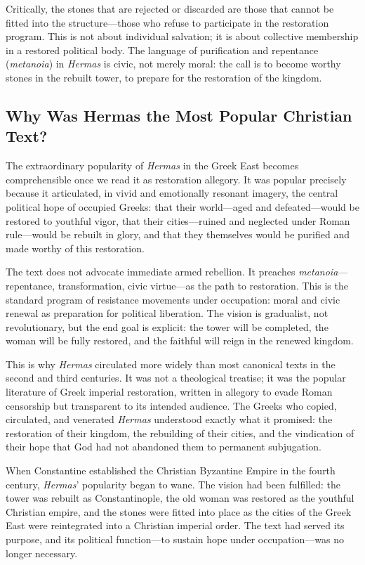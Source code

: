 Critically, the stones that are rejected or discarded are those that cannot be fitted into the structure---those who refuse to participate in the restoration program.
This is not about individual salvation; it is about collective membership in a restored political body.
The language of purification and repentance (\emph{metanoia}) in \emph{Hermas} is civic, not merely moral: the call is to become worthy stones in the rebuilt tower, to prepare for the restoration of the kingdom.

\subsection{Why Was Hermas the Most Popular Christian Text?}

The extraordinary popularity of \emph{Hermas} in the Greek East becomes comprehensible once we read it as restoration allegory.
It was popular precisely because it articulated, in vivid and emotionally resonant imagery, the central political hope of occupied Greeks: that their world---aged and defeated---would be restored to youthful vigor, that their cities---ruined and neglected under Roman rule---would be rebuilt in glory, and that they themselves would be purified and made worthy of this restoration.

The text does not advocate immediate armed rebellion.
It preaches \emph{metanoia}---repentance, transformation, civic virtue---as the path to restoration.
This is the standard program of resistance movements under occupation: moral and civic renewal as preparation for political liberation.
The vision is gradualist, not revolutionary, but the end goal is explicit: the tower will be completed, the woman will be fully restored, and the faithful will reign in the renewed kingdom.

This is why \emph{Hermas} circulated more widely than most canonical texts in the second and third centuries.
It was not a theological treatise; it was the popular literature of Greek imperial restoration, written in allegory to evade Roman censorship but transparent to its intended audience.
The Greeks who copied, circulated, and venerated \emph{Hermas} understood exactly what it promised: the restoration of their kingdom, the rebuilding of their cities, and the vindication of their hope that God had not abandoned them to permanent subjugation.

When Constantine established the Christian Byzantine Empire in the fourth century, \emph{Hermas}' popularity began to wane.
The vision had been fulfilled: the tower was rebuilt as Constantinople, the old woman was restored as the youthful Christian empire, and the stones were fitted into place as the cities of the Greek East were reintegrated into a Christian imperial order.
The text had served its purpose, and its political function---to sustain hope under occupation---was no longer necessary.

